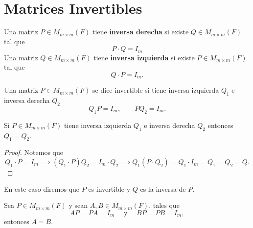 \documentclass[12pt,a4paper]{book}
\begin{document}
    \section{Matrices Invertibles}

    \begin{definicion}
    \label{def:9}
        Una matriz $P\in M_{m\times m}(F)$ tiene \textbf{inversa derecha} si existe $Q\in M_{m\times m}(F)$ tal que
        \begin{equation*}
            P\cdot Q=I_{m}
        \end{equation*}
        Una matriz $Q\in M_{m\times m}(F)$ tiene \textbf{inversa izquierda} si existe $P\in M_{m\times m}(F)$
        tal que
        \begin{equation*}
            Q\cdot P=I_{m}.
        \end{equation*}
    \end{definicion}

    Una matriz $P\in M_{m\times m}(F)$ se dice invertible si tiene inversa izquierda $Q_{1}$ e
    inversa derecha $Q_{2}$
    \begin{equation*}
        Q_{1}P=I_{m},\qquad PQ_{2}=I_{m}.
    \end{equation*}

    \begin{proposicion}
    \label{prop:9}
        Si $P\in M_{m\times m}(F)$ tiene inversa izquierda $Q_{1}$ e inversa derecha $Q_{2}$ entonces
        $Q_{1}=Q_{2}$.
    \end{proposicion}

    \begin{proof}
        Notemos que
        \begin{equation*}
        Q_{1}\cdot P=I_{m}\implies(Q_{1}\cdot P)Q_{2}=I_{m}\cdot Q_{2}\implies Q_{1}(P\cdot Q_{2})=Q_{1}\cdot I_{m}=Q_{1}=Q_{2}=Q.
        \end{equation*}
    \end{proof}
    En este caso diremos que $P$ es invertible y $Q$ es la inversa de $P$.

    \begin{proposicion}
    \label{prop:10}
        Sea $P\in M_{m\times m}(F)$ y sean $A,B\in M_{m\times m}(F)$, tales que
        \begin{equation*}
            AP=PA=I_{m}\quad\text{ y }\quad BP=PB=I_{m},
        \end{equation*}
        entonces $A=B$.
    \end{proposicion}
\end{document}
